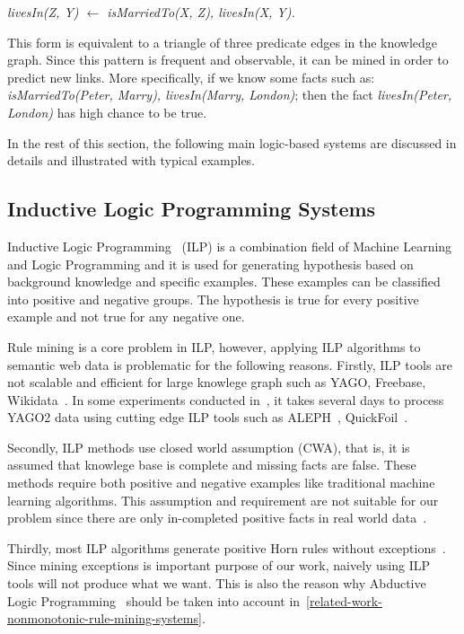 \centerline{\textit{livesIn(Z, Y) $\leftarrow$ isMarriedTo(X, Z), livesIn(X, Y).}}

This form is equivalent to a triangle of three predicate edges in the knowledge graph. Since this pattern is frequent and observable, it can be mined in order to predict new links. More specifically, if we know some facts such as: \textit{isMarriedTo(Peter, Marry), livesIn(Marry, London)}; then the fact \textit{livesIn(Peter, London)} has high chance to be true.

In the rest of this section, the following main logic-based systems are discussed in details and illustrated with typical examples.

\subsection{Inductive Logic Programming Systems}

Inductive Logic Programming~\cite{ref9} (ILP) is a combination field of Machine Learning and Logic Programming and it is used for generating hypothesis based on background knowledge and specific examples. These examples can be classified into positive and negative groups. The hypothesis is true for every positive example and not true for any negative one.

Rule mining is a core problem in ILP, however, applying ILP algorithms to semantic web data is problematic for the following reasons. Firstly, ILP tools are not scalable and efficient for large knowlege graph such as YAGO, Freebase, Wikidata~\cite{ref10}. In some experiments conducted in~\cite{ref10}, it takes several days to process YAGO2 data using cutting edge ILP tools such as ALEPH~\cite{ref14, ref10}, QuickFoil~\cite{ref15, ref10}.

Secondly, ILP methods use closed world assumption (CWA), that is, it is assumed that knowlege base is complete and missing facts are false. These methods require both positive and negative examples like traditional machine learning algorithms. This assumption and requirement are not suitable for our problem since there are only in-completed positive facts in real world data~\cite{ref10}.

Thirdly, most ILP algorithms generate positive Horn rules without exceptions~\cite{ref11}. Since mining exceptions is important purpose of our work, naively using ILP tools will not produce what we want. This is also the reason why Abductive Logic Programming~\cite{ref11} should be taken into account in~\ref{related-work-nonmonotonic-rule-mining-systems}.

